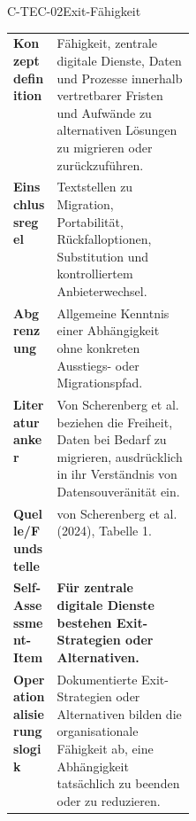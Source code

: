 \documentclass[10pt,a4paper]{article}
\begin{document}
\begin{codecard}{C-TEC-02}{Exit-Fähigkeit}
\begin{tabularx}{\linewidth}{@{}>{\RaggedRight\arraybackslash\bfseries\color{DeepNavy}}p{0.245\linewidth}>{\RaggedRight\arraybackslash}X@{}}
Konzeptdefinition & Fähigkeit, zentrale digitale Dienste, Daten und Prozesse innerhalb vertretbarer Fristen und Aufwände zu alternativen Lösungen zu migrieren oder zurückzuführen. \\
\arrayrulecolor{SoftRule}\hline
Einschlussregel & Textstellen zu Migration, Portabilität, Rückfalloptionen, Substitution und kontrolliertem Anbieterwechsel. \\
\arrayrulecolor{SoftRule}\hline
Abgrenzung & Allgemeine Kenntnis einer Abhängigkeit ohne konkreten Ausstiegs- oder Migrationspfad. \\
\arrayrulecolor{SoftRule}\hline
Literaturanker & Von Scherenberg et al. beziehen die Freiheit, Daten bei Bedarf zu migrieren, ausdrücklich in ihr Verständnis von Datensouveränität ein. \\
\arrayrulecolor{SoftRule}\hline
Quelle/Fundstelle & von Scherenberg et al. (2024), Tabelle 1. \\
\arrayrulecolor{SoftRule}\hline
Self-Assessment-Item & \textbf{Für zentrale digitale Dienste bestehen Exit-Strategien oder Alternativen.} \\
\arrayrulecolor{SoftRule}\hline
Operationalisierungslogik & Dokumentierte Exit-Strategien oder Alternativen bilden die organisationale Fähigkeit ab, eine Abhängigkeit tatsächlich zu beenden oder zu reduzieren. \\
\end{tabularx}
\end{codecard}
\end{document}
